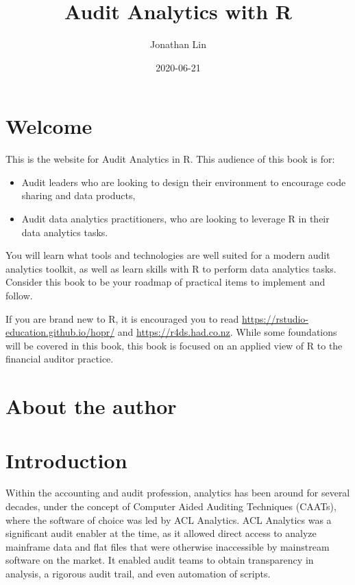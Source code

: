 \documentclass[
]{book}
\title{Audit Analytics with R}
\author{Jonathan Lin}
\date{2020-06-21}
\providecommand{\tightlist}{%
  \setlength{\itemsep}{0pt}\setlength{\parskip}{0pt}}
\begin{document}
\maketitle

{
\setcounter{tocdepth}{1}
\tableofcontents
}
\hypertarget{welcome}{%
\chapter*{Welcome}\label{welcome}}

This is the website for Audit Analytics in R. This audience of this book is for:

\begin{itemize}
\tightlist
\item
  Audit leaders who are looking to design their environment to encourage code sharing and data products,
\item
  Audit data analytics practitioners, who are looking to leverage R in their data analytics tasks.
\end{itemize}

You will learn what tools and technologies are well suited for a modern audit analytics toolkit, as well as learn skills with R to perform data analytics tasks. Consider this book to be your roadmap of practical items to implement and follow.

If you are brand new to R, it is encouraged you to read \url{https://rstudio-education.github.io/hopr/} and \url{https://r4ds.had.co.nz}. While some foundations will be covered in this book, this book is focused on an applied view of R to the financial auditor practice.

\hypertarget{about-the-author}{%
\chapter*{About the author}\label{about-the-author}}

\hypertarget{intro}{%
\chapter{Introduction}\label{intro}}

Within the accounting and audit profession, analytics has been around for several decades, under the concept of Computer Aided Auditing Techniques (CAATs), where the software of choice was led by ACL Analytics. ACL Analytics was a significant audit enabler at the time, as it allowed direct access to analyze mainframe data and flat files that were otherwise inaccessible by mainstream software on the market. It enabled audit teams to obtain transparency in analysis, a rigorous audit trail, and even automation of scripts.
\end{document}
